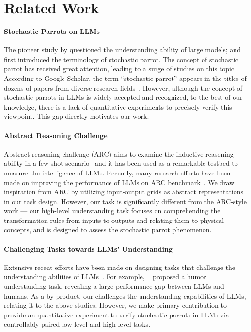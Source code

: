 \section{Related Work}
\paragraph{Stochastic Parrots on LLMs}
The pioneer study by \cite{bender2020climbing} questioned the understanding ability of large models; and \citet{bender2021dangers} first introduced the terminology of stochastic parrot.
The concept of stochastic parrot has received great attention, leading to a surge of studies on this topic. 
According to Google Scholar, the term ``stochastic parrot'' appears in the titles of dozens of papers from diverse research fields~\cite{borji2023stochastic,li2023dark,duan2024flocks,henrique2023stochastic}. 
However, although the concept of stochastic parrots in LLMs is widely accepted and recognized, to the best of our knowledge, there is a lack of quantitative experiments to precisely verify this viewpoint. This gap directly motivates our work.




\paragraph{Abstract Reasoning Challenge}

Abstract reasoning challenge (ARC) aims to examine the inductive reasoning ability in a few-shot scenario~\cite{chollet2019measure} and it has been used as a remarkable testbed to measure the intelligence of LLMs.
Recently, many research efforts have been made on improving the performance of LLMs on ARC benchmark~\cite{tan2023large,wang2023hypothesis,xu2023llms,mirchandani2023large,wang2024speak,huang2024anpl}. 
We draw inspiration from ARC by utilizing input-output grids as abstract representations in our task design. However, our task is significantly different from the ARC-style work --- our high-level understanding task focuses on comprehending the transformation rules from inputs to outputs and relating them to physical concepts, and is designed to assess the stochastic parrot phenomenon.


\paragraph{Challenging Tasks towards LLMs' Understanding}
Extensive recent efforts have been made on designing tasks that challenge the understanding abilities of LLMs~\cite{chakrabarty-etal-2022-flute,tong2024metaphor,shapira-etal-2023-well,hessel-etal-2023-androids,donadel2024can,li2024previously}. 
For example, %
~\citet{hessel-etal-2023-androids} proposed a humor understanding task, revealing a large performance gap between LLMs and humans.
As a by-product, our \datasetname challenges the understanding capabilities of LLMs, relating it to the above studies. 
However, we make primary contribution to provide an quantitative experiment to verify stochastic parrots in LLMs via controllably paired low-level and high-level tasks.